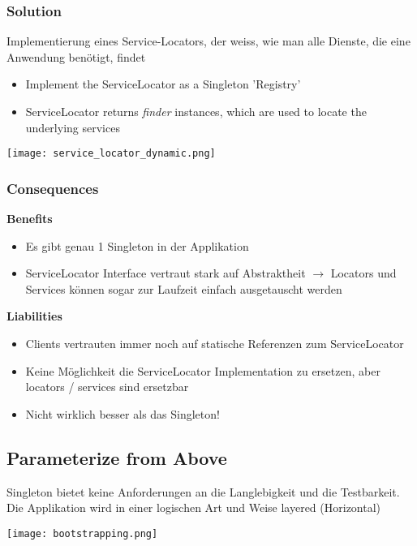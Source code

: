 \subsubsection{Solution}
Implementierung eines Service-Locators, der weiss, wie man alle Dienste, die eine Anwendung benötigt, findet

\begin{itemize}
    \item Implement the ServiceLocator as a Singleton 'Registry'
    \item ServiceLocator returns \textit{finder} instances, which are used to locate the underlying services
\end{itemize}

\texttt{[image: service\_locator\_dynamic.png]}

\subsubsection{Consequences}
\textbf{Benefits}
\begin{itemize}
    \item Es gibt genau 1 Singleton in der Applikation
    \item ServiceLocator Interface vertraut stark auf Abstraktheit $\rightarrow$ Locators und Services können sogar zur Laufzeit einfach ausgetauscht werden
\end{itemize}
\vspace{10pt}
\textbf{Liabilities}
\begin{itemize}
    \item Clients vertrauten immer noch auf statische Referenzen zum ServiceLocator
    \item Keine Möglichkeit die ServiceLocator Implementation zu ersetzen, aber locators / services sind ersetzbar
    \item Nicht wirklich besser als das Singleton!
\end{itemize}

\vfill\null
\columnbreak

\subsection{Parameterize from Above}

Singleton bietet keine Anforderungen an die Langlebigkeit und die Testbarkeit. Die Applikation wird in einer logischen Art und Weise layered (Horizontal)

\texttt{[image: bootstrapping.png]}

